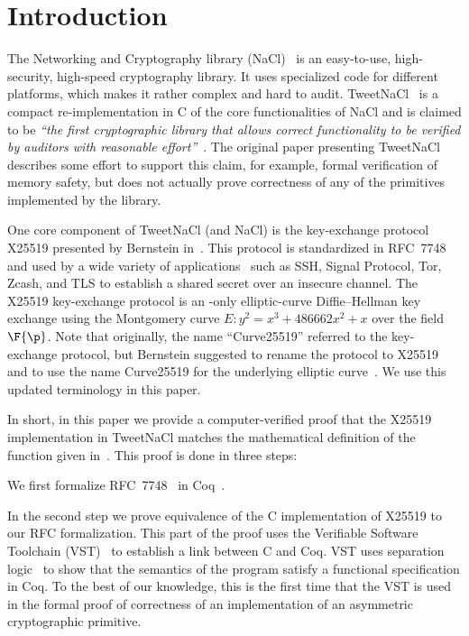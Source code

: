 \section{Introduction}
\label{sec:intro}

The Networking and Cryptography library (NaCl)~\cite{BLS12}
is an easy-to-use, high-security, high-speed cryptography library.
It uses specialized code for different platforms, which makes it rather complex and hard to audit.
TweetNaCl~\cite{BGJ+15} is a compact re-implementation in C
of the core functionalities of NaCl and is claimed to be
\emph{``the first cryptographic library that allows correct functionality
to be verified by auditors with reasonable effort''}~\cite{BGJ+15}.
The original paper presenting TweetNaCl describes some effort to support
this claim, for example, formal verification of memory safety, but does not actually
prove correctness of any of the primitives implemented by the library.

One core component of TweetNaCl (and NaCl) is the key-exchange protocol X25519 presented
by Bernstein in~\cite{Ber06}.
This protocol is standardized in RFC~7748 and used by a wide variety of applications~\cite{things-that-use-curve25519}
such as SSH, Signal Protocol, Tor, Zcash, and TLS to establish a shared secret over
an insecure channel.
The X25519 key-exchange protocol is an \xcoord-only
elliptic-curve Diffie--Hellman key exchange using the Montgomery
curve $E: y^2 = x^3 + 486662 x^2 + x$ over the field $\F{\p}$.
Note that originally, the name ``Curve25519'' referred to the key-exchange protocol,
but Bernstein suggested to rename the protocol to X25519 and to use the name
Curve25519 for the underlying elliptic curve~\cite{Ber14}.
We use this updated terminology in this paper.

In short, in this paper we provide a computer-verified proof that the
X25519 implementation in TweetNaCl matches the mathematical definition
of the function given in~\cite[Sec.~2]{Ber06}.
This proof is done in three steps:

We first formalize RFC~7748~\cite{rfc7748} in Coq~\cite{coq-faq}.

In the second step we prove equivalence of the C implementation of X25519
to our RFC formalization.
This part of the proof uses the Verifiable Software Toolchain (VST)~\cite{2012-Appel}
to establish a link between C and Coq.
VST uses separation logic~\cite{1969-Hoare,Reynolds02separationlogic}
to show that the semantics of the program satisfy a functional specification in Coq.
To the best of our knowledge, this is the first time that the VST
is used in the formal proof of correctness of an implementation
of an asymmetric cryptographic primitive.

